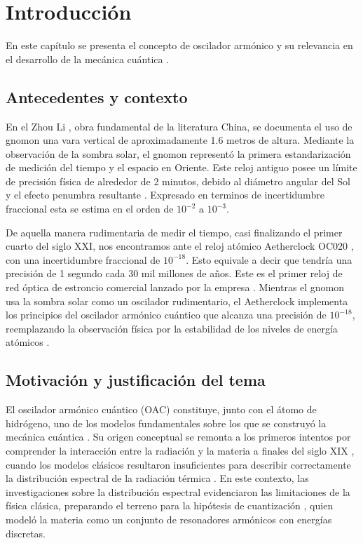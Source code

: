 \chapter{Introducción}
En este capítulo se presenta el concepto de oscilador armónico \citep{Biot1851} y su relevancia en el desarrollo de la mecánica cuántica \citep{born1925}.

\section{Antecedentes y contexto}
En el Zhou Li \citep{biot1851tcheou}, obra fundamental de la literatura China,  se documenta el uso de gnomon una vara vertical de aproximadamente 1.6 metros de altura. Mediante la observación de la sombra solar, el gnomon representó la primera estandarización de medición del tiempo y el espacio en Oriente. Este reloj antiguo posee un límite de precisión física de alrededor de 2 minutos, debido al diámetro angular del Sol y el efecto penumbra resultante \citep{newton1687}. Expresado en terminos de incertidumbre fraccional  \citep{eisenhart1963} esta se estima en el orden de $10^{-2} \text{ a } 10^{-3}$.

De aquella manera rudimentaria de medir el tiempo, casi finalizando el primer cuarto del siglo XXI, nos encontramos ante el reloj atómico Aetherclock OC020 \citep{okaba2024optical}, con una incertidumbre fraccional de $10^{-18}$. Esto equivale a decir que tendría una precisión de 1 segundo cada 30 mil millones de años. Este es el primer reloj de red óptica de estroncio \citep{takamoto2003} comercial lanzado por la empresa \cite{shimadzu2025aetherclock}. Mientras el gnomon usa la sombra solar como un oscilador rudimentario, el Aetherclock implementa los principios del oscilador armónico cuántico que alcanza una precisión de $10^{-18}$, reemplazando la observación  física \citep{Biot1851} por la estabilidad de los niveles de energía atómicos \citep{bohr1913}. 


\section{Motivación y justificación del tema}
El oscilador armónico cuántico (OAC)\citep{Biot1851} constituye, junto con el átomo de hidrógeno, uno de los modelos fundamentales sobre los que se construyó la mecánica cuántica \citep{born1925}. Su origen conceptual se remonta a los primeros intentos por comprender la interacción entre la radiación y la materia a finales del siglo XIX \citep{wien1896, rayleigh1900, jeans1905}, cuando los modelos clásicos resultaron insuficientes para describir correctamente la distribución espectral \citep{wien1896} de la radiación térmica \citep{rayleigh1900}. En este contexto, las investigaciones sobre la distribución espectral evidenciaron las limitaciones de la física clásica, preparando el terreno para la hipótesis de cuantización \citep{planck1901}, quien modeló la materia como un conjunto de resonadores armónicos con energías discretas.


